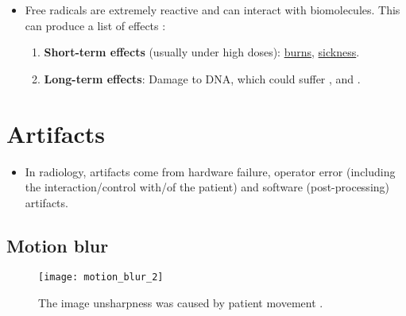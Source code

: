 \begin{itemize}
\item Free radicals are extremely reactive and can interact with
  biomolecules. This can produce a list of effects
  \cite{bushberg2011essential}:
  \begin{enumerate}
  \item \textbf{Short-term effects} (usually under high doses):
    \href{https://en.wikipedia.org/wiki/Radiation_burn}{burns},
    \href{https://en.wikipedia.org/wiki/Sickness}{sickness}.
  \item \textbf{Long-term effects}: Damage to DNA, which could suffer
    , and .
  \end{enumerate}
\end{itemize}

\section{Artifacts}
\begin{itemize}
\item In radiology, artifacts come from hardware failure, operator
  error (including the interaction/control with/of the patient) and
  software (post-processing) artifacts.
\end{itemize}

\newpage
\subsection*{Motion blur}
\vspace{-1ex}
\begin{figure}[H]
  \centering
  \texttt{[image: motion\_blur\_2]}
  \caption{The image unsharpness was caused by patient movement
    \cite{radiology_key}.\label{fig:motion_blur}}
\end{figure}

\newpage
